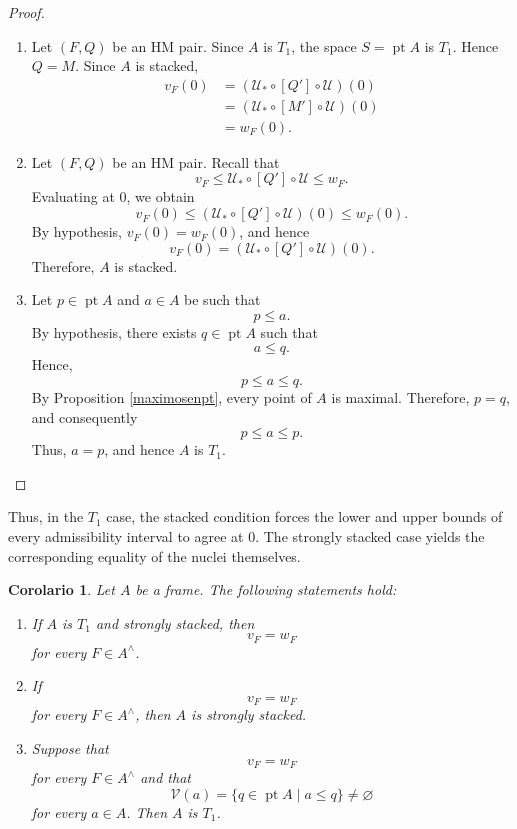 \documentclass[11pt]{amsart}
\DeclareMathOperator{\pt}{pt}
\theoremstyle{plain}
\newtheorem{cor}[thm]{Corolario}
\theoremstyle{definition}
\begin{document}
\begin{proof}
	\mbox{}
\begin{enumerate}
	\item Let $(F,Q)$ be an HM pair. Since $A$ is $T_1$, the space
$S=\pt A$ is $T_1$. Hence $Q=M$. Since $A$ is stacked,
\[
\begin{aligned}
v_F(0)
&=(\mathcal{U}_*\circ[Q']\circ\mathcal{U})(0)\\
&=(\mathcal{U}_*\circ[M']\circ\mathcal{U})(0)\\
&=w_F(0).
\end{aligned}
\]

\item Let $(F,Q)$ be an HM pair. Recall that
\begin{equation}\label{interad}
v_F
\leq
\mathcal{U}_*\circ[Q']\circ\mathcal{U}
\leq
w_F.
\end{equation}
Evaluating at $0$, we obtain
\[
v_F(0)
\leq
(\mathcal{U}_*\circ[Q']\circ\mathcal{U})(0)
\leq
w_F(0).
\]
By hypothesis, $v_F(0)=w_F(0)$, and hence
\[
v_F(0)
=
(\mathcal{U}_*\circ[Q']\circ\mathcal{U})(0).
\]
Therefore, $A$ is stacked.

\item Let $p\in\pt A$ and $a\in A$ be such that
\[
p\leq a.
\]
By hypothesis, there exists $q\in\pt A$ such that
\[
a\leq q.
\]
Hence,
\[
p\leq a\leq q.
\]
By Proposition \ref{maximosenpt}, every point of $A$ is maximal. Therefore, $p=q$, and
consequently
\[
p\leq a\leq p.
\]
Thus, $a=p$, and hence $A$ is $T_1$.
\end{enumerate}
\end{proof}

Thus, in the $T_1$ case, the stacked condition forces the lower and upper
bounds of every admissibility interval to agree at $0$. The strongly stacked
case yields the corresponding equality of the nuclei themselves.

\begin{cor}\label{vF=wF}
Let $A$ be a frame. The following statements hold:
\begin{enumerate}
    \item If $A$ is $T_1$ and strongly stacked, then
    \[
    v_F=w_F
    \]
    for every $F\in A^\wedge$.

    \item If
    \[
    v_F=w_F
    \]
    for every $F\in A^\wedge$, then $A$ is strongly stacked.

    \item Suppose that
    \[
    v_F=w_F
    \]
    for every $F\in A^\wedge$ and that
    \[
    \mathcal{V}(a)=\{q\in\pt A\mid a\leq q\}\neq\varnothing
    \]
    for every $a\in A$. Then $A$ is $T_1$.
\end{enumerate}
\end{cor}
\end{document}
